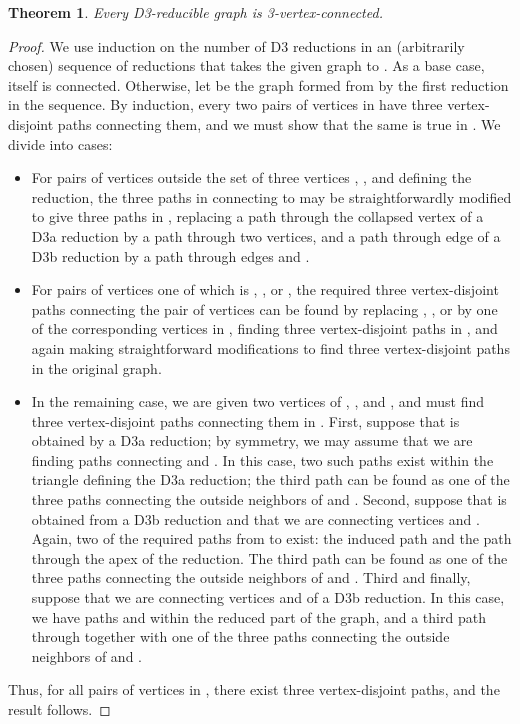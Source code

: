 \documentclass{article}
\newtheorem{theorem}{Theorem}
\begin{document}
\begin{theorem}
Every D3-reducible graph is 3-vertex-connected.
\end{theorem}

\begin{proof}
We use induction on the number of D3 reductions in an (arbitrarily chosen) sequence of reductions that takes the given graph  to . As a base case,  itself is connected. Otherwise, let  be the graph formed from  by the first reduction in the sequence. By induction, every two pairs of vertices in  have three vertex-disjoint paths connecting them, and we must show that the same is true in . We divide into cases:
\begin{itemize}
\item For pairs of vertices  outside the set of three vertices , , and  defining the reduction,
the three paths in  connecting  to  may be straightforwardly modified to give three paths in , replacing a path through the collapsed vertex of a D3a reduction by a path through two vertices, and a path through edge  of a D3b reduction by a path through edges  and .
\item For pairs of vertices one of which is , , or , the required three vertex-disjoint paths connecting the pair of vertices can be found by replacing , , or  by one of the corresponding vertices in , finding three vertex-disjoint paths in , and again making straightforward modifications to find three vertex-disjoint paths in the original graph.
\item In the remaining case, we are given two vertices of , , and , and must find three vertex-disjoint paths connecting them in . First, suppose that  is obtained by a D3a reduction; by symmetry, we may assume that we are finding paths connecting  and . In this case, two such paths exist within the triangle defining the D3a reduction; the third path can be found as one of the three paths connecting the outside neighbors of  and . Second, suppose that  is obtained from a D3b reduction and that we are connecting vertices  and . Again, two of the required paths from  to  exist: the induced path  and the path  through the apex of the reduction. The third path can be found as one of the three paths connecting the outside neighbors of  and . Third and finally, suppose that we are connecting vertices  and  of a D3b reduction. In this case, we have paths  and  within the reduced part of the graph, and a third path through  together with one of the three paths connecting the outside neighbors of  and .
\end{itemize}
Thus, for all pairs of vertices in , there exist three vertex-disjoint paths, and the result follows.
\end{proof}
\end{document}
